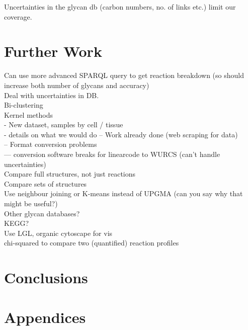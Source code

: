 \documentclass[12pt,a4paper]{article}
\begin{document}
Uncertainties in the glycan db (carbon numbers, no. of links etc.) limit our coverage.

\newpage
\section{Further Work}
\label{sec:further_work}

Can use more advanced SPARQL query to get reaction breakdown (so should increase both number of glycans and accuracy)\\

Deal with uncertainties in DB.\\

Bi-clustering\\

Kernel methods\\

- New dataset, samples by cell / tissue\\
- details on what we would do
-- Work already done (web scraping for data)\\
-- Format conversion problems\\
--- conversion software breaks for linearcode to WURCS (can't handle uncertainties)\\

Compare full structures, not just reactions\\

Compare sets of structures\\

Use neighbour joining or K-means instead of UPGMA (can you say why that might be useful?)\\

Other glycan databases?\\

KEGG?\\

Use LGL, organic cytoscape for vis\\

chi-squared to compare two (quantified) reaction profiles\\

\newpage
\section{Conclusions}
\label{sec:conclusions}

\newpage
\section*{Appendices}
\appendix
\end{document}
